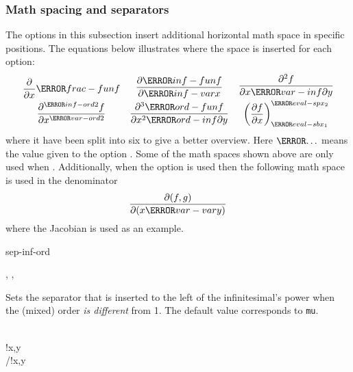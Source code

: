 \subsubsection*{Math spacing and separators}
The options in this subsection insert additional horizontal math space in specific positions. The equations below illustrates where the space is inserted for each option:%
\begin{align*}
	\begin{gathered}
		\frac{ \partial }{ \partial x } \ms{frac-fun} f \\
		\frac{ \partial^{ \ms{inf-ord} 2 } f }{ \partial x^{ \ms{var-ord} 2 } }
	\end{gathered}
	&&
	\begin{gathered}
		\frac{ \partial \ms{inf-fun} f }{ \partial \ms{inf-var} x } \\
		\frac{ \partial^3 \ms{ord-fun} f }{ \partial x^2 \ms{ord-inf} \partial y }
	\end{gathered}
	&&
	\begin{gathered}
		\frac{ \partial^2 f }{ \partial x \ms{var-inf} \partial y }   \\
		\mleft( \frac{ \partial f}{ \partial x } \mright)_{ \ms{eval-sb} x_1}^{ \ms{eval-sp} x_2}
	\end{gathered}
\end{align*}
where it have been split into six to give a better overview. Here $\ms{\dots}$ means the value given to the option . Some of the math spaces shown above are only used when . Additionally, when the option  is used then the following math space is used in the denominator
\begin{equation*}
	\frac{\partial(f, g)}{\partial(x \ms{var-var} y)}
\end{equation*}
where the Jacobian is used as an example.

\clearpage

\begin{option}{sep-inf-ord}
	\begin{values}[default = 0]
		, , 
	\end{values}
	Sets the separator that is inserted to the left of the infinitesimal's power when the (mixed) order \emph{is different} from \num{1}. The default value corresponds to  \texttt{mu}.
	\begin{example}
		 \\
		!{x,y} \\
		/!{x,y}
	\end{example}
\end{option}

